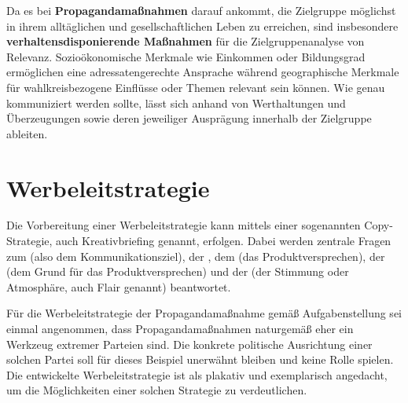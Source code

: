 Da es bei \textbf{Propagandamaßnahmen} darauf ankommt, die Zielgruppe möglichst in ihrem alltäglichen und gesellschaftlichen Leben zu erreichen, sind insbesondere \textbf{verhaltensdisponierende Maßnahmen} für die Zielgruppenanalyse von Relevanz. Sozioökonomische Merkmale wie Einkommen oder Bildungsgrad ermöglichen eine adressatengerechte Ansprache während geographische Merkmale für wahlkreisbezogene Einflüsse oder Themen relevant sein können. Wie genau kommuniziert werden sollte, lässt sich anhand von Werthaltungen und Überzeugungen sowie deren jeweiliger Ausprägung innerhalb der Zielgruppe ableiten.

\section{Werbeleitstrategie}
\label{sec:04-04_advertising-strategy}

Die Vorbereitung einer Werbeleitstrategie kann mittels einer sogenannten Copy-Strategie, auch Kreativbriefing genannt, erfolgen. Dabei werden zentrale Fragen zum \textbf{} (also dem Kommunikationsziel), der \textbf{}, dem \textbf{} (das Produktversprechen), der \textbf{} (dem Grund für das Produktversprechen) und der \textbf{} (der Stimmung oder Atmosphäre, auch Flair genannt) beantwortet. \cite[S. 31 f.]{002_MKO03_communication-communication-goals-and-advertising-conception}

Für die Werbeleitstrategie der Propagandamaßnahme gemäß Aufgabenstellung sei einmal angenommen, dass Propagandamaßnahmen naturgemäß eher ein Werkzeug extremer Parteien sind. Die konkrete politische Ausrichtung einer solchen Partei soll für dieses Beispiel unerwähnt bleiben und keine Rolle spielen. Die entwickelte Werbeleitstrategie ist als plakativ und exemplarisch angedacht, um die Möglichkeiten einer solchen Strategie zu verdeutlichen.

